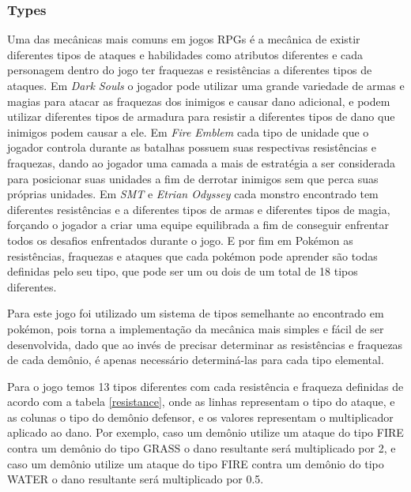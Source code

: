 \subsubsection{Types}

Uma das mecânicas mais comuns em jogos RPGs é a mecânica de existir diferentes tipos de ataques e habilidades como atributos diferentes e cada personagem dentro do jogo ter fraquezas e resistências a diferentes tipos de ataques. Em \emph{Dark Souls} o jogador pode utilizar uma grande variedade de armas e magias para atacar as fraquezas dos inimigos e causar dano adicional, e podem utilizar diferentes tipos de armadura para resistir a diferentes tipos de dano que inimigos podem causar a ele. Em \emph{Fire Emblem} cada tipo de unidade que o jogador controla durante as batalhas possuem suas respectivas resistências e fraquezas, dando ao jogador uma camada a mais de estratégia a ser considerada para posicionar suas unidades a fim de derrotar inimigos sem que perca suas próprias unidades. Em \emph{SMT} e \emph{Etrian Odyssey} cada monstro encontrado tem diferentes resistências e  a diferentes tipos de armas e diferentes tipos de magia, forçando o jogador a criar uma equipe equilibrada a fim de conseguir enfrentar todos os desafios enfrentados durante o jogo. E por fim em Pokémon as resistências, fraquezas e ataques que cada pokémon pode aprender são todas definidas pelo seu tipo, que pode ser um ou dois de um total de 18 tipos diferentes.

Para este jogo foi utilizado um sistema de tipos semelhante ao encontrado em pokémon, pois torna a implementação da mecânica mais simples e fácil de ser desenvolvida, dado que ao invés de precisar determinar as resistências e fraquezas de cada demônio, é apenas necessário determiná-las para cada tipo elemental.

Para o jogo temos 13 tipos diferentes com cada resistência e fraqueza definidas de acordo com a tabela \ref{resistance}, onde as linhas representam o tipo do ataque, e as colunas o tipo do demônio defensor, e os valores representam o multiplicador aplicado ao dano. Por exemplo, caso um demônio utilize um ataque do tipo FIRE contra um demônio do tipo GRASS o dano resultante será multiplicado por 2, e caso um demônio utilize um ataque do tipo FIRE contra um demônio do tipo WATER o dano resultante será multiplicado por 0.5.

